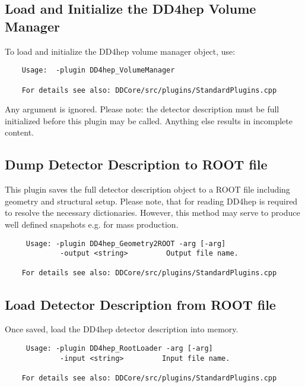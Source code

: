 \subsection{Load and Initialize the DD4hep Volume Manager}
\label{sec:dd4hep-manual-plugin-volume-manager}

To load and initialize the DD4hep volume manager object, use:
\begin{verbatim}
    Usage:  -plugin DD4hep_VolumeManager

    For details see also: DDCore/src/plugins/StandardPlugins.cpp
\end{verbatim}
Any argument is ignored. Please note: the detector description must be full initialized 
before this plugin may be called. Anything else results in incomplete content.


\subsection{Dump Detector Description to ROOT file}
\label{sec:dd4hep-manual-plugin-save-dd4hep-root}

This plugin saves the full detector description object to a ROOT file 
including geometry and structural setup. Please note, that for reading 
DD4hep is required to resolve the necessary dictionaries. However, this 
method may serve to produce well defined snapshots e.g. for mass production.
\begin{verbatim}
     Usage: -plugin DD4hep_Geometry2ROOT -arg [-arg]
             -output <string>         Output file name.

    For details see also: DDCore/src/plugins/StandardPlugins.cpp
\end{verbatim}

\subsection{Load Detector Description from ROOT file}
\label{sec:dd4hep-manual-plugin-load-dd4hep-root}

Once saved, load the DD4hep detector description into memory.
\begin{verbatim}
     Usage: -plugin DD4hep_RootLoader -arg [-arg]
             -input <string>         Input file name.

    For details see also: DDCore/src/plugins/StandardPlugins.cpp
\end{verbatim}

